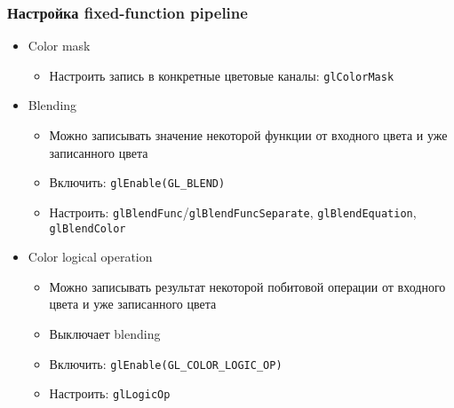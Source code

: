 \documentclass{beamer}
\begin{document}
\begin{frame}[fragile]
\frametitle{Настройка fixed-function pipeline}
\begin{itemize}
\item Color mask
\begin{itemize}
\item Настроить запись в конкретные цветовые каналы: \verb|glColorMask|
\end{itemize}
\pause
\item Blending
\begin{itemize}
\item Можно записывать значение некоторой функции от входного цвета и уже записанного цвета
\item Включить: \verb|glEnable(GL_BLEND)|
\item Настроить: \verb|glBlendFunc|/\verb|glBlendFuncSeparate|, \verb|glBlendEquation|, \verb|glBlendColor|
\end{itemize}
\pause
\item Color logical operation
\begin{itemize}
\item Можно записывать результат некоторой побитовой операции от входного цвета и уже записанного цвета
\item Выключает blending
\item Включить: \verb|glEnable(GL_COLOR_LOGIC_OP)|
\item Настроить: \verb|glLogicOp|
\end{itemize}
\end{itemize}
\end{frame}
\end{document}
